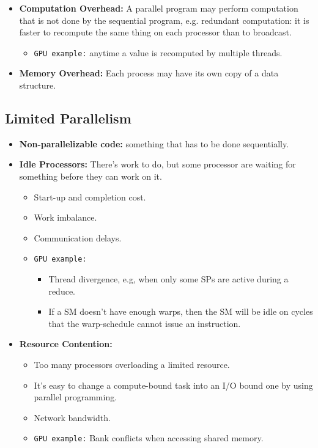 \documentclass[../main.tex]{subfiles}
\begin{document}
\begin{itemize}
\begin{itemize}
{		            }
	      \end{itemize}
	\item \textbf{Computation Overhead:} A parallel program may perform computation that is not done by the sequential program, e.g. redundant computation: it is faster to recompute the same thing on each processor than to broadcast.
	      \begin{itemize}
		      \item \texttt{GPU example:} anytime a value is recomputed by multiple threads.
	      \end{itemize}
	\item \textbf{Memory Overhead:} Each process may have its own copy of a data structure.
\end{itemize}

\subsection{Limited Parallelism}

\begin{itemize}
	\item \textbf{Non-parallelizable code:} something that has to be done sequentially.
	\item \textbf{Idle Processors:} There's work to do, but some processor are waiting for something before they can work on it.
	      \begin{itemize}
		      \item Start-up and completion cost.
		      \item Work imbalance.
		      \item Communication delays.
		      \item {
		            \texttt{GPU example:}
		            \begin{itemize}
			            \item Thread divergence, e.g, when only some SPs are active during a reduce.
			            \item If a SM doesn't have enough warps, then the SM will be idle on cycles that the warp-schedule cannot issue an instruction.
		            \end{itemize}
		            }
	      \end{itemize}
	\item \textbf{Resource Contention:}
	      \begin{itemize}
		      \item Too many processors overloading a limited resource.
		      \item It's easy to change a compute-bound task into an I/O bound one by using parallel programming.
		      \item Network bandwidth.
		      \item \texttt{GPU example:} Bank conflicts when accessing shared memory.
	      \end{itemize}
\end{itemize}
\end{document}
